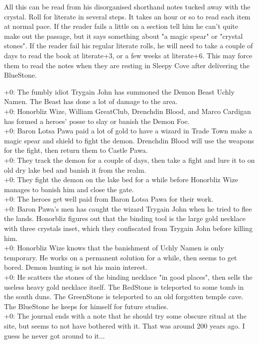 All this can be read from his disorganised shorthand notes tucked away with the crystal. Roll for literate in several steps. It takes an hour or so to read each item at normal pace. If the reader fails a little on a section tell him he can't quite make out the passage, but it says something about "a magic spear" or "crystal stones".
If the reader fail his regular literate rolls, he will need to take a couple of days to read the book at literate+3, or a few weeks at literate+6. This may force them to read the notes when they are resting in Sleepy Cove after delivering the BlueStone.
\begin{readoutloud}
\textnormal{+0:} The fumbly idiot Trygain John has summoned the Demon Beast Uchly Namen. The Beast has done a lot of damage to the area. \\
\textnormal{+0:} Honorbliz Wize, William GreatClub, Drenchdin Blood, and Marco Cardigan has formed a heroes' posse to slay or banish the Demon Foe. \\
\textnormal{+0:} Baron Lotsa Pawa paid a lot of gold to have a wizard in Trade Town make a magic spear and shield to fight the demon. Drenchdin Blood will use the weapons for the fight, then return them to Castle Pawa. \\
\textnormal{+0:} They track the demon for a couple of days, then take a fight and lure it to on old dry lake bed and banish it from the realm. \\
\textnormal{+0:} They fight the demon on the lake bed for a while before Honorbliz Wize manages to banish him and close the gate. \\
\textnormal{+0:} The heroes get well paid from Baron Lotsa Pawa for their work.\\
\textnormal{+0:} Baron Pawa's men has caught the wizard Trygain John when he tried to flee the lands. Honorbliz figures out that the binding tool is the large gold necklace with three crystals inset, which they confiscated from Trygain John before killing him.\\
\textnormal{+0:} Honorbliz Wize knows that the banishment of Uchly Namen is only temporary. He works on a permanent solution for a while, then seems to get bored. Demon hunting is not his main interest. \\
\textnormal{+0:} He scatters the stones of the binding necklace "in good places", then sells the useless heavy gold necklace itself. The RedStone is teleported to some tomb in the south duns. The GreenStone is teleported to an old forgotten temple cave. The BlueStone he keeps for himself for future studies.\\
\textnormal{+0:} The journal ends with a note that he should try some obscure ritual at the site, but seems to not have bothered with it. That was around 200 years ago. I guess he never got around to it...
\end{readoutloud}

